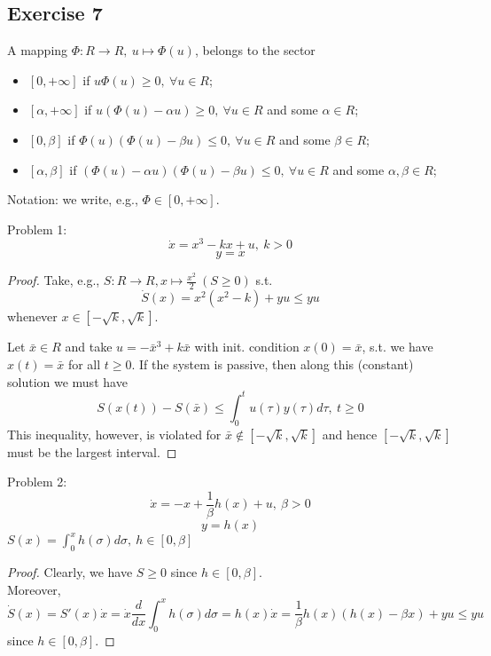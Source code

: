     \subsection{Exercise 7}
    \begin{Definition}
    A mapping $\Phi: R \rightarrow R, \ u \mapsto \Phi(u)$, belongs to the sector
    \begin{itemize}
        \item $[0,+\infty]$ if $u\Phi(u) \ge 0, \ \forall u \in R$;
        \item $[\alpha,+\infty]$ if $u(\Phi(u)-\alpha u) \ge 0, \ \forall u \in R$ and some $\alpha \in R$;
        \item $[0,\beta]$ if $\Phi(u)(\Phi(u)-\beta u) \le 0, \ \forall u \in R$ and some $\beta \in R$;
        \item $[\alpha,\beta]$ if $(\Phi(u)-\alpha u)(\Phi(u)-\beta u) \le 0, \ \forall u \in R$ and some $\alpha, \beta \in R$;
    \end{itemize}
    Notation: we write, e.g., $\Phi \in [0,+\infty]$.
    \end{Definition}
    
    Problem 1:
    $$\dot x = x^3-kx+u, \ k>0$$
    $$y = x$$
    \begin{proof}
        Take, e.g., $S:R \rightarrow R, x \mapsto \frac{x^2}{2} \ (S \ge 0)$ s.t.
        $$\dot S(x) = x^2(x^2-k)+yu \le yu$$
        whenever $x \in [-\sqrt{k}, \sqrt{k}].$
        
        Let $\bar x \in R$ and take $u = - \bar x^3 + k \bar x$ with init. condition $x(0) = \bar x$, s.t. we have $x(t) = \bar x$ for all $t \ge 0$. If the system is passive, then along this (constant) solution we must have
        $$S(x(t))-S(\bar x) \le \int_0^t u(\tau)y(\tau)d\tau, \ t \ge 0$$ 
        This inequality, however, is violated for $\bar x \notin [-\sqrt{k}, \sqrt{k}]$ and hence $[-\sqrt{k}, \sqrt{k}]$ must be the largest interval.
    \end{proof}
    
    Problem 2:
    $$\dot x = -x+\frac{1}{\beta}h(x)+u, \ \beta>0$$
    $$y = h(x)$$
    $S(x) = \int_0^x h(\sigma) d \sigma, \ h \in [0,\beta]$
    \begin{proof}
        Clearly, we have $S \ge 0$ since $h \in [0, \beta]$.\\
        Moreover,
        $$\dot S(x) = S'(x) \dot x = \dot x \frac{d}{dx}\int_0^x h(\sigma)d\sigma = h(x)\dot x = \frac{1}{\beta}h(x)(h(x)-\beta x) + yu \le yu$$
        since $h \in [0,\beta]$.
    \end{proof}
    
